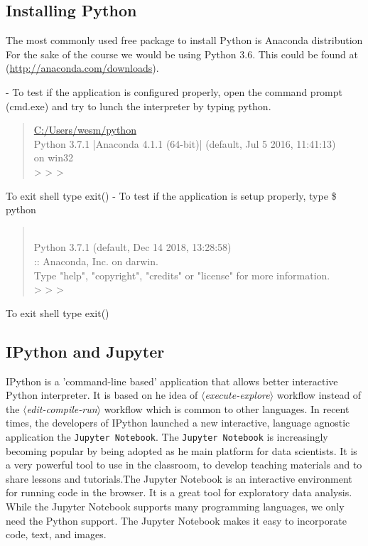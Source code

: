 \documentclass{tufte-handout}
\newcommand{\docopt}[1]{\ensuremath{\langle}\textrm{\textit{#1}}\ensuremath{\rangle}}%
\newenvironment{docspec}{\begin{quote}\noindent}{\end{quote}}%
\newcommand{\docenv}[1]{\textsf{#1}}%
\newcommand{\doccls}[1]{\texttt{#1}}%
\begin{document}
\subsection{Installing Python}

The most commonly used free package to install Python is Anaconda distribution For the sake of the course we would be using Python 3.6. This could be found at (\url{http://anaconda.com/downloads}).

- To test if the application is configured properly, open the command prompt (cmd.exe) and try to lunch the interpreter by typing \docenv{python}. 
\begin{docspec}
\url{C:/Users/wesm/python}
\\Python 3.7.1 |Anaconda 4.1.1 (64-bit)| (default, Jul 5 2016, 11:41:13)
\\[MSC v.1900 64 bit (AMD64)] on win32
\\> > > 
\end{docspec}
To exit shell type \docenv{exit()}
 - To test if the application is setup properly, type \docenv{\$ python}
\begin{docspec}
\\ Python 3.7.1 (default, Dec 14 2018, 13:28:58) 
\\ [Clang 4.0.1 (tags/RELEASE \_ 401/final)] :: Anaconda, Inc. on darwin.
\\ Type "help", "copyright", "credits" or "license" for more information.
\\> > > 
\end{docspec}
To exit shell type \docenv{exit()}

\subsection{IPython and Jupyter}
IPython is a 'command-line based' application that allows better interactive Python interpreter. It is based on he idea of \docopt{execute-explore}  workflow instead of the  \docopt{edit-compile-run} workflow which is common to other languages. 
In recent times, the developers of  IPython launched a new interactive, language agnostic application the \doccls{Jupyter Notebook}.
The \doccls{Jupyter Notebook} is increasingly becoming popular by being adopted as he main platform for data scientists. It is a very powerful tool to use in the classroom, to develop teaching materials and to share lessons and tutorials.The Jupyter Notebook is an interactive environment for running code in the browser. It is a great tool for exploratory data analysis. While the Jupyter Notebook supports many programming languages, we only need the Python support. The Jupyter Notebook makes it easy to incorporate code, text, and images. 
\end{document}
